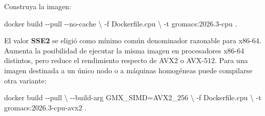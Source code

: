 \documentclass[
  spanish,
  11pt,
  a4paper]{article}
\newenvironment{Shaded}{\begin{snugshade}}{\end{snugshade}}
\newcommand{\AttributeTok}[1]{\textcolor[rgb]{0.13,0.29,0.53}{#1}}
\newcommand{\DataTypeTok}[1]{\textcolor[rgb]{0.13,0.29,0.53}{#1}}
\newcommand{\ExtensionTok}[1]{#1}
\newcommand{\FunctionTok}[1]{\textcolor[rgb]{0.13,0.29,0.53}{\textbf{#1}}}
\newcommand{\KeywordTok}[1]{\textcolor[rgb]{0.13,0.29,0.53}{\textbf{#1}}}
\newcommand{\NormalTok}[1]{#1}
\newcommand{\OperatorTok}[1]{\textcolor[rgb]{0.81,0.36,0.00}{\textbf{#1}}}
\newcommand{\PreprocessorTok}[1]{\textcolor[rgb]{0.56,0.35,0.01}{\textit{#1}}}
\newcommand{\StringTok}[1]{\textcolor[rgb]{0.31,0.60,0.02}{#1}}
\begin{document}
\begin{Shaded}
\end{Shaded}

Construya la imagen:

\begin{Shaded}
\begin{Highlighting}[]
\ExtensionTok{docker}\NormalTok{ build }\AttributeTok{{-}{-}pull} \AttributeTok{{-}{-}no{-}cache} \DataTypeTok{\textbackslash{}}
  \AttributeTok{{-}f}\NormalTok{ Dockerfile.cpu }\DataTypeTok{\textbackslash{}}
  \AttributeTok{{-}t}\NormalTok{ gromacs:2026.3{-}cpu .}
\end{Highlighting}
\end{Shaded}

El valor \textbf{SSE2} se eligió como mínimo común denominador razonable
para x86-64. Aumenta la posibilidad de ejecutar la misma imagen en
procesadores x86-64 distintos, pero reduce el rendimiento respecto de
AVX2 o AVX-512. Para una imagen destinada a un único nodo o a máquinas
homogéneas puede compilarse otra variante:

\begin{Shaded}
\begin{Highlighting}[]
\ExtensionTok{docker}\NormalTok{ build }\AttributeTok{{-}{-}pull} \DataTypeTok{\textbackslash{}}
  \AttributeTok{{-}{-}build{-}arg}\NormalTok{ GMX\_SIMD=AVX2\_256 }\DataTypeTok{\textbackslash{}}
  \AttributeTok{{-}f}\NormalTok{ Dockerfile.cpu }\DataTypeTok{\textbackslash{}}
  \AttributeTok{{-}t}\NormalTok{ gromacs:2026.3{-}cpu{-}avx2 .}
\end{Highlighting}
\end{Shaded}
\end{document}
